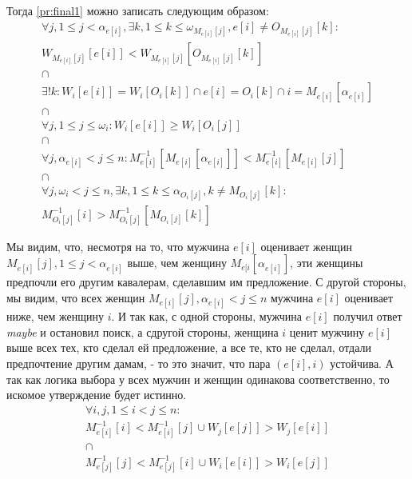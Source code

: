 \documentclass{article}
\begin{document}
Тогда \ref{pr:final1} можно записать следующим образом:
\begin{equation}
    \label{pr:final2}
    \begin{array}{c}
    \forall j, 1 \leq j < \alpha_{e[i]}, \exists k, 1 \leq k \leq \omega_{M_{e[i]}[j]}, e[i] \neq O_{M_{e[i]}[j]}[k] : \\
    W_{M_{e[i]}[j]}[e[i]] < W_{M_{e[i]}[j]}[O_{M_{e[i]}[j]}[k]] \\
    \cap \\
    \exists ! k : W_i[e[i]] = W_i[O_i[k]] \cap e[i] = O_i[k] \cap i = M_{e[i]}[\alpha_{e[i]}] \\
    \cap \\
    \forall j, 1 \leq j \leq \omega_i : W_i[e[i]] \geq W_i[O_i[j]] \\
    \cap \\
    \forall j, \alpha_{e[i]} < j \leq n : M^{-1}_{e[i]}[M_{e[i]}[\alpha_{e[i]}]] < M^{-1}_{e[i]}[M_{e[i]}[j]] \\
    \cap \\
    \forall j, \omega_i < j \leq n, \exists k, 1 \leq k \leq \alpha_{O_i[j]}, k \neq M_{O_i[j]}[k] : \\
    M^{-1}_{O_i[j]}[i] > M^{-1}_{O_i[j]}[M_{O_i[j]}[k]]
    \end{array}
\end{equation}

Мы видим, что, несмотря на то, что мужчина \( e[i] \) оценивает женщин \( M_{e[i]}[j], 1 \leq j < \alpha_{e[i]} \) выше, чем
женщину \( M_{e[i}[\alpha_{e[i]}] \), эти женщины предпочли его другим кавалерам, сделавшим им предложение. С другой стороны,
мы видим, что всех женщин \( M_{e[i]}[j], \alpha_{e[i]} < j \leq n \) мужчина \( e[i] \) оценивает ниже, чем женщину  \( i \).
И так как, с одной стороны, мужчина \( e[i] \) получил ответ \emph{maybe} и остановил поиск, а сдругой стороны,
женщина \( i \) ценит мужчину \( e[i] \) выше всех тех, кто сделал ей предложение, а все те, кто не сделал, отдали предпочтение
другим дамам, - то это значит, что пара \( (e[i],i) \) устойчива. А так как логика выбора у всех мужчин и женщин одинакова
соответственно, то искомое утверждение будет истинно.
\begin{displaymath}
\begin{array}{c}
\forall i, j, 1 \leq i < j \leq n : \\
M^{-1}_{e[i]}[i] < M^{-1}_{e[i]}[j] \cup W_j[e[j]] > W_j[e[i]] \\
\cap \\
M^{-1}_{e[j]}[j] < M^{-1}_{e[j]}[i] \cup W_i[e[i]] > W_i[e[j]]
\end{array}
\end{displaymath}
\end{document}
